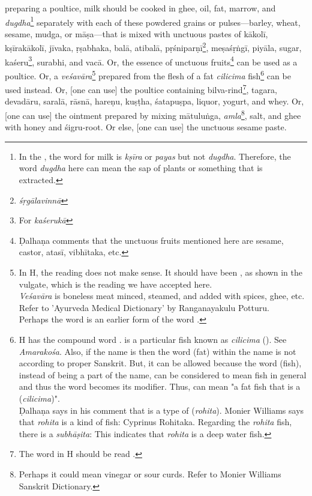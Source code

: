 \begin{translation}
preparing a poultice, milk should be cooked in ghee, oil, fat, marrow, and \emph{dugdha}\footnote{In the \SS, the word for milk is \textit{kṣīra} or \textit{payas} but not \textit{dugdha}. Therefore, the word \textit{dugdha} here can mean the sap of plants or something that is extracted.} separately with each of these powdered grains or pulses---barley, wheat, sesame, \gls{mudga}, or \gls{māṣa}---that is mixed with unctuous pastes of \gls{kākolī}, \gls{kṣīrakākolī}, \gls{jīvaka}, \gls{ṛṣabhaka}, \gls{balā}, \gls{atibalā}, \gls{pṛśniparṇī}\footnote{\emph{śṛgālavinnā}}, \gls{meṣaśṛṅgī}, \gls{piyāla}, sugar, \gls{kaśeru}\footnote{For \emph{kaśerukā}}, \gls{surabhi}, and \gls{vacā}. Or, the essence of unctuous fruits\footnote{Ḍalhaṇa comments \citep[425]{vulgate} that the unctuous fruits mentioned here are sesame, castor, \gls{atasī}, \gls{vibhītaka}, etc.} can be used as a poultice. Or, a \textit{veśavāra}\footnote{In H, the reading  does not make sense. It should have been , as shown in the vulgate, which is the reading we have accepted here.\\ \textit{Veśavāra} is boneless meat minced, steamed, and added with spices, ghee, etc. Refer to 'Ayurveda Medical Dictionary' by Ranganayakulu Potturu.\\Perhaps the word  is an earlier form of the word .} prepared from the flesh of a fat \textit{cilicima} fish\footnote{H has the compound word .  is a particular fish known as \textit{cilicima} (). See \textit{Amarakośa}. Also, if the name is  then the word  (fat) within the name is not according to proper Sanskrit. But, it can be allowed because the word  (fish), instead of being a part of the name, can be considered to mean fish in general and thus the word  becomes its modifier. Thus,  can mean "a fat fish that is a  (\textit{cilicima})".\\ Ḍalhaṇa says in his comment \citep[425]{vulgate} that  is a type of  (\textit{rohita}). Monier Williams says that \textit{rohita} is a kind of fish: Cyprinus Rohitaka. Regarding the \textit{rohita} fish, there is a \textit{subhāṣita}:  This indicates that \textit{rohita} is a deep water fish.} can be used instead. Or, [one can use] the poultice containing \gls{bilva}-rind\footnote{The word  in H should be read .}, \gls{tagara}, \gls{devadāru}, \gls{saralā}, \gls{rāsnā}, \gls{hareṇu}, \gls{kuṣṭha}, \gls{śatapuṣpa}, liquor, yogurt, and whey. Or, [one can use] the ointment prepared by mixing \gls{mātuluṅga}, \emph{amla}\footnote{Perhaps it could mean vinegar or sour curds. Refer to Monier Williams Sanskrit Dictionary.}, salt, and ghee with honey and \gls{śigru}-root. Or else, [one can use] the unctuous sesame paste. 


\end{translation}
